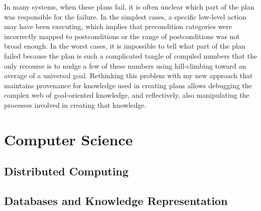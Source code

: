 In many systems, when these plans fail, it is often unclear which part
of the plan was responsible for the failure.  In the simplest cases, a
specific low-level action may have been executing, which implies that
precondition categories were incorrectly mapped to postconditions or
the range of postconditions was not broad enough.  In the worst cases,
it is impossible to tell what part of the plan failed because the plan
is such a complicated tangle of compiled numbers that the only
recourse is to nudge a few of these numbers using hill-climbing toward
an average of a universal goal.  Rethinking this problem with my new
approach that maintains provenance for knowledge used in creating
plans allows debugging the complex web of goal-oriented knowledge, and
reflectively, also manipulating the processes involved in creating
that knowledge.



\section{Computer Science}

\subsection{Distributed Computing}

\subsection{Databases and Knowledge Representation}

